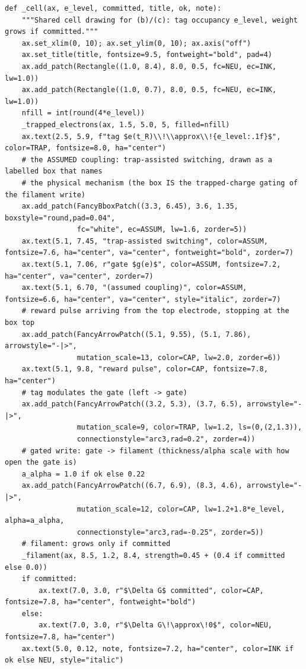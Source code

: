 \begin{lstlisting}[caption={schematics.ipynb code cell 3},label={lst:mrl-nb-schematics-3}]
def _cell(ax, e_level, committed, title, ok, note):
    """Shared cell drawing for (b)/(c): tag occupancy e_level, weight grows if committed."""
    ax.set_xlim(0, 10); ax.set_ylim(0, 10); ax.axis("off")
    ax.set_title(title, fontsize=9.5, fontweight="bold", pad=4)
    ax.add_patch(Rectangle((1.0, 8.4), 8.0, 0.5, fc=NEU, ec=INK, lw=1.0))
    ax.add_patch(Rectangle((1.0, 0.7), 8.0, 0.5, fc=NEU, ec=INK, lw=1.0))
    nfill = int(round(4*e_level))
    _trapped_electrons(ax, 1.5, 5.0, 5, filled=nfill)
    ax.text(2.5, 5.9, f"tag $e(t_R)\\!\\approx\\!{e_level:.1f}$", color=TRAP, fontsize=8.0, ha="center")
    # the ASSUMED coupling: trap-assisted switching, drawn as a labelled box that names
    # the physical mechanism (the box IS the trapped-charge gating of the filament write)
    ax.add_patch(FancyBboxPatch((3.3, 6.45), 3.6, 1.35, boxstyle="round,pad=0.04",
                 fc="white", ec=ASSUM, lw=1.6, zorder=5))
    ax.text(5.1, 7.45, "trap-assisted switching", color=ASSUM, fontsize=7.6, ha="center", va="center", fontweight="bold", zorder=7)
    ax.text(5.1, 7.06, r"gate $g(e)$", color=ASSUM, fontsize=7.2, ha="center", va="center", zorder=7)
    ax.text(5.1, 6.70, "(assumed coupling)", color=ASSUM, fontsize=6.6, ha="center", va="center", style="italic", zorder=7)
    # reward pulse arriving from the top electrode, stopping at the box top
    ax.add_patch(FancyArrowPatch((5.1, 9.55), (5.1, 7.86), arrowstyle="-|>",
                 mutation_scale=13, color=CAP, lw=2.0, zorder=6))
    ax.text(5.1, 9.8, "reward pulse", color=CAP, fontsize=7.8, ha="center")
    # tag modulates the gate (left -> gate)
    ax.add_patch(FancyArrowPatch((3.2, 5.3), (3.7, 6.5), arrowstyle="-|>",
                 mutation_scale=9, color=TRAP, lw=1.2, ls=(0,(2,1.3)),
                 connectionstyle="arc3,rad=0.2", zorder=4))
    # gated write: gate -> filament (thickness/alpha scale with how open the gate is)
    a_alpha = 1.0 if ok else 0.22
    ax.add_patch(FancyArrowPatch((6.7, 6.9), (8.3, 4.6), arrowstyle="-|>",
                 mutation_scale=12, color=CAP, lw=1.2+1.8*e_level, alpha=a_alpha,
                 connectionstyle="arc3,rad=-0.25", zorder=5))
    # filament: grows only if committed
    _filament(ax, 8.5, 1.2, 8.4, strength=0.45 + (0.4 if committed else 0.0))
    if committed:
        ax.text(7.0, 3.0, r"$\Delta G$ committed", color=CAP, fontsize=7.8, ha="center", fontweight="bold")
    else:
        ax.text(7.0, 3.0, r"$\Delta G\!\approx\!0$", color=NEU, fontsize=7.8, ha="center")
    ax.text(5.0, 0.12, note, fontsize=7.2, ha="center", color=INK if ok else NEU, style="italic")


\end{lstlisting}
